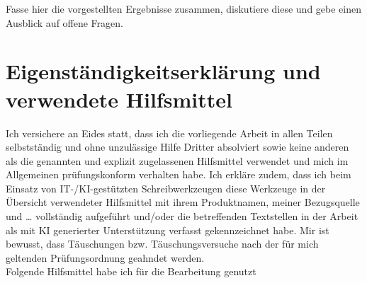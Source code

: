 \documentclass[a4paper,ngerman]{article}
\theoremstyle{nonumberplain}
\begin{document}
Fasse hier die vorgestellten Ergebnisse zusammen, diskutiere diese und gebe einen Ausblick auf offene Fragen. 

\nolinenumbers

 \printbibliography 
 
 \appendix
 
 \section{Eigenständigkeitserklärung und verwendete Hilfsmittel}
Ich versichere an Eides statt, dass ich die vorliegende Arbeit in allen Teilen selbstständig und ohne unzulässige Hilfe Dritter absolviert sowie keine anderen als die genannten und explizit zugelassenen Hilfsmittel verwendet und mich im Allgemeinen prüfungskonform verhalten habe. Ich erkläre zudem, dass ich beim Einsatz von IT-/KI-gestützten Schreibwerkzeugen diese Werkzeuge in der Übersicht verwendeter Hilfsmittel mit ihrem Produktnamen, meiner Bezugsquelle und … vollständig aufgeführt und/oder die betreffenden Textstellen in der Arbeit als mit KI generierter Unterstützung verfasst gekennzeichnet habe. Mir ist bewusst, dass Täuschungen bzw. Täuschungsversuche nach der für mich geltenden Prüfungsordnung geahndet werden.\\


Folgende Hilfsmittel habe ich für die Bearbeitung genutzt
 
\end{document}
